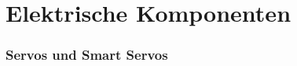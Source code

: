 \section{Elektrische Komponenten}

\begin{frame}
	
	
	\frametitle{Servos und Smart Servos}
	
	\vspace{-2em}
	

\end{frame}

